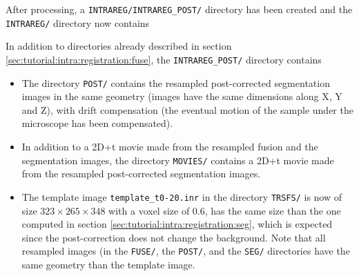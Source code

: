 After processing, a \texttt{INTRAREG/INTRAREG\_POST/} directory has
been created and the \texttt{INTRAREG/} directory now contains

\mbox{}
\mbox{}

In addition to directories already described in section
\ref{sec:tutorial:intra:registration:fuse}, the \texttt{INTRAREG\_POST/} directory contains
\begin{itemize}
\itemsep -1ex
\item The directory \texttt{POST/} contains the resampled
  post-corrected segmentation images
  in the same geometry (images have the same dimensions along X, Y and
  Z), with drift compensation (the eventual motion of the sample under the
  microscope has been compensated). 
\item In addition to a 2D+t movie made from the resampled fusion
  and the segmentation images, the directory \texttt{MOVIES/} contains
  a 2D+t movie made from the resampled post-corrected segmentation
  images.
\item The template image \texttt{template\_t0-20.inr} in the directory
  \texttt{TRSFS/} 
  is now of size $323 \times 265 \times 348$ with a voxel size of 0.6,
  has the same size than the one computed in section
  \ref{sec:tutorial:intra:registration:seg},  which is expected since
  the post-correction does not change the background.
  Note that all resampled images (in the \texttt{FUSE/}, the
  \texttt{POST/}, and the
  \texttt{SEG/} directories have the same geometry than the template
  image. 
\end{itemize}



